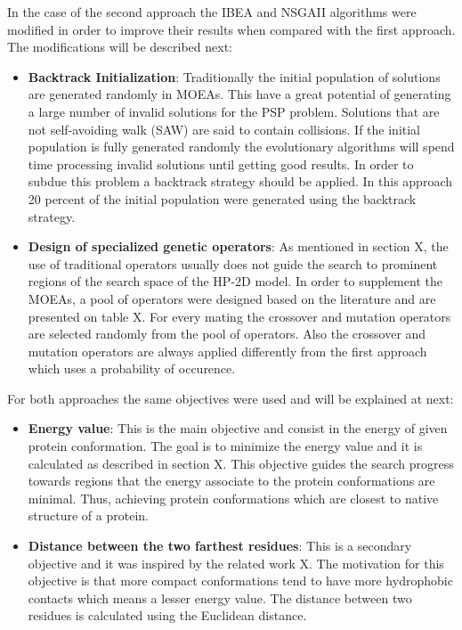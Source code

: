 In the case of the second approach the IBEA and NSGAII algorithms were modified in order to improve their results when compared with the first approach. The modifications will be described next:

\begin{itemize}
	\item \textbf{Backtrack Initialization}: Traditionally the initial population of solutions are generated randomly in MOEAs. This have a great potential of generating a large number of invalid solutions for the PSP problem. Solutions that are not self-avoiding walk (SAW) are said to contain collisions. If the initial population is fully generated randomly the evolutionary algorithms will spend time processing invalid solutions until getting good results. In order to subdue this problem a backtrack strategy should be applied. In this approach 20 percent of the initial population were generated using the backtrack strategy.
	\item \textbf{Design of specialized genetic operators}:  As mentioned in section X, the use of traditional operators usually does not guide the search to prominent regions of the search space of the HP-2D model. In order to supplement the MOEAs, a pool of operators were designed based on the literature and are presented on table X.  For every mating the crossover and mutation operators are selected randomly from the pool of operators. Also the crossover and mutation operators are always applied differently from the first approach which uses a probability of occurence. 
\end{itemize}

For both approaches the same objectives were used and will be explained  at next:

\begin{itemize}
	\item \textbf{Energy value}: This is the main objective and consist in the energy of given protein conformation.  The goal is to minimize the energy value and it is calculated as described in section X. This objective guides the search progress towards regions that the energy associate to the protein conformations are minimal. Thus, achieving protein conformations which are closest to native structure of a protein.
	\item \textbf{Distance between the two farthest residues}: This is a secondary objective and it was inspired by the related work X. The motivation for this objective is that more compact conformations tend to have more hydrophobic contacts which means a lesser energy value. The distance between two residues is calculated using the Euclidean distance.
\end{itemize}


